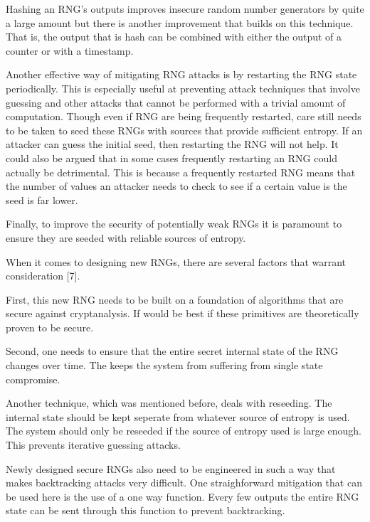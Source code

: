 \documentclass{article}
\begin{document}
    Hashing an RNG's outputs improves insecure random number generators by quite
    a large amount but there is another improvement that builds on this technique.
    That is, the output that is hash can be combined with either the output
    of a counter or with a timestamp.

    Another effective way of mitigating RNG attacks is by restarting
    the RNG state periodically. This is especially useful at preventing
    attack techniques that involve guessing and other attacks that cannot
    be performed with a trivial amount of computation.
    Though even if RNG are being frequently restarted, care still needs
    to be taken to seed these RNGs with sources that provide sufficient
    entropy. If an attacker can guess the initial seed, then restarting
    the RNG will not help.
    It could also be argued that in some cases frequently restarting
    an RNG could actually be detrimental.
    This is because a frequently restarted RNG means that the number
    of values an attacker needs to check to see if a certain value
    is the seed is far lower.

    Finally, to improve the security of potentially weak RNGs it is paramount
    to ensure they are seeded with reliable sources of entropy.

    When it comes to designing new RNGs, there are several factors
    that warrant consideration [7].

    First, this new RNG needs to be built on a foundation
    of algorithms that are secure against cryptanalysis.
    If would be best if these primitives are theoretically proven to be secure.

    Second, one needs to ensure that the entire secret internal state of the RNG
    changes over time.
    The keeps the system from suffering from single state compromise.

    Another technique, which was mentioned before, deals with reseeding.
    The internal state should be kept seperate from whatever source of entropy
    is used. The system should only be reseeded if the source of entropy used
    is large enough. This prevents iterative guessing attacks.

    Newly designed secure RNGs also need to be engineered in such a way that
    makes backtracking attacks very difficult.
    One straighforward mitigation that can be used here is the use of a
    one way function. Every few outputs the entire RNG state can be sent
    through this function to prevent backtracking.
\end{document}
